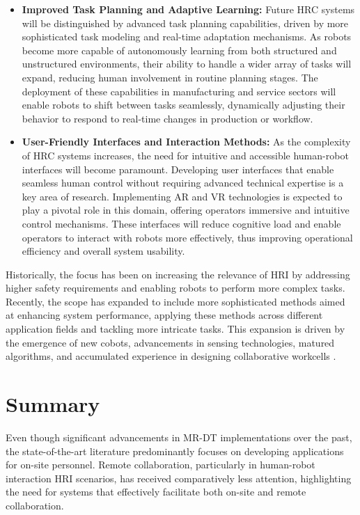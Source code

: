 \begin{itemize}
    \item \textbf{Improved Task Planning and Adaptive Learning:} Future \ac{HRC} systems will be distinguished by advanced task planning capabilities, driven by more sophisticated task modeling and real-time adaptation mechanisms. As robots become more capable of autonomously learning from both structured and unstructured environments, their ability to handle a wider array of tasks will expand, reducing human involvement in routine planning stages. The deployment of these capabilities in manufacturing and service sectors will enable robots to shift between tasks seamlessly, dynamically adjusting their behavior to respond to real-time changes in production or workflow.

    \item \textbf{User-Friendly Interfaces and Interaction Methods:} As the complexity of \ac{HRC} systems increases, the need for intuitive and accessible human-robot interfaces will become paramount. Developing user interfaces that enable seamless human control without requiring advanced technical expertise is a key area of research. Implementing \ac{AR} and \ac{VR} technologies is expected to play a pivotal role in this domain, offering operators immersive and intuitive control mechanisms. These interfaces will reduce cognitive load and enable operators to interact with robots more effectively, thus improving operational efficiency and overall system usability.
\end{itemize}


Historically, the focus has been on increasing the relevance of \ac{HRI} by addressing higher safety requirements and enabling 
robots to perform more complex tasks. Recently, the scope has expanded to include more sophisticated methods aimed at enhancing system performance, 
applying these methods across different application fields and tackling more intricate tasks. This expansion is driven by the emergence of new 
cobots, advancements in sensing technologies, matured algorithms, and accumulated experience in designing collaborative workcells \cite{robotics8040100}.

\section{Summary}

Even though significant advancements in \ac{MR}-\ac{DT} implementations over the past, the state-of-the-art literature predominantly focuses on developing applications for on-site personnel. Remote collaboration, particularly in human-robot interaction \ac{HRI} scenarios, has received comparatively less attention, highlighting the need for systems that effectively facilitate both on-site and remote collaboration.

